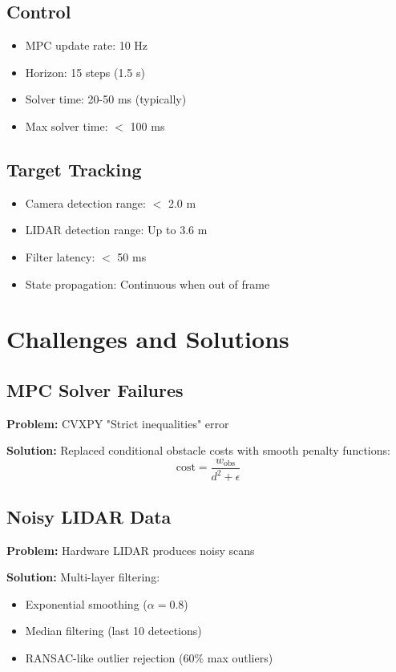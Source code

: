 \documentclass[11pt]{article}
\begin{document}
\subsection{Control}
\begin{itemize}
    \item MPC update rate: 10 Hz
    \item Horizon: 15 steps (1.5 s)
    \item Solver time: 20-50 ms (typically)
    \item Max solver time: $<$ 100 ms
\end{itemize}

\subsection{Target Tracking}
\begin{itemize}
    \item Camera detection range: $<$ 2.0 m
    \item LIDAR detection range: Up to 3.6 m
    \item Filter latency: $<$ 50 ms
    \item State propagation: Continuous when out of frame
\end{itemize}

\section{Challenges and Solutions}

\subsection{MPC Solver Failures}

\textbf{Problem:} CVXPY "Strict inequalities" error

\textbf{Solution:} Replaced conditional obstacle costs with smooth penalty functions:
\[
\text{cost} = \frac{w_{\text{obs}}}{d^2 + \epsilon}
\]

\subsection{Noisy LIDAR Data}

\textbf{Problem:} Hardware LIDAR produces noisy scans

\textbf{Solution:} Multi-layer filtering:
\begin{itemize}
    \item Exponential smoothing ($\alpha = 0.8$)
    \item Median filtering (last 10 detections)
    \item RANSAC-like outlier rejection (60\% max outliers)
\end{itemize}
\end{document}
